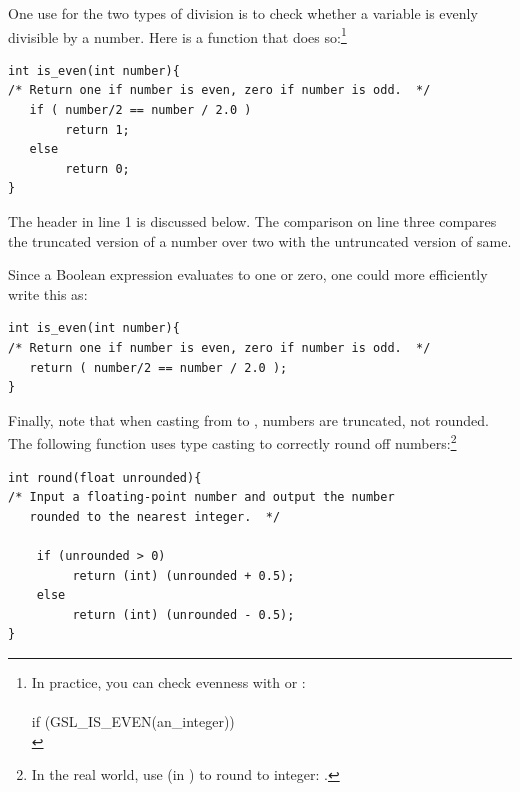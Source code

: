 One use for the two types of division is to check whether a variable is evenly divisible by a number. Here
is a function that does so:\footnote{In practice, you can check evenness
with  or :\\ 
\\
if (GSL\_IS\_EVEN(an\_integer))\\
\phantom{hello.}
}

\lstset{numbers=left, numberstyle=\scshape}\label{isevenfn}
\begin{lstlisting}
int is_even(int number){
/* Return one if number is even, zero if number is odd.  */
   if ( number/2 == number / 2.0 )
        return 1;
   else 
        return 0;
}
\end{lstlisting}
The header in line 1 is discussed below. The comparison on line three
compares the truncated version of a number over two with the untruncated
version of same.

Since a Boolean expression evaluates to one or zero,
one could more efficiently write this as:
\begin{lstlisting}
int is_even(int number){
/* Return one if number is even, zero if number is odd.  */
   return ( number/2 == number / 2.0 );
}
\end{lstlisting}

Finally, note that when casting from  to , numbers
are truncated, not rounded.  The following function uses type casting
to correctly round off numbers:\footnote{In the real world, use
 (in ) to round to integer: .}

\begin{lstlisting}
int round(float unrounded){
/* Input a floating-point number and output the number
   rounded to the nearest integer.  */

    if (unrounded > 0)
         return (int) (unrounded + 0.5);
    else
         return (int) (unrounded - 0.5);
}
\end{lstlisting}
\lstset{numbers=none}

